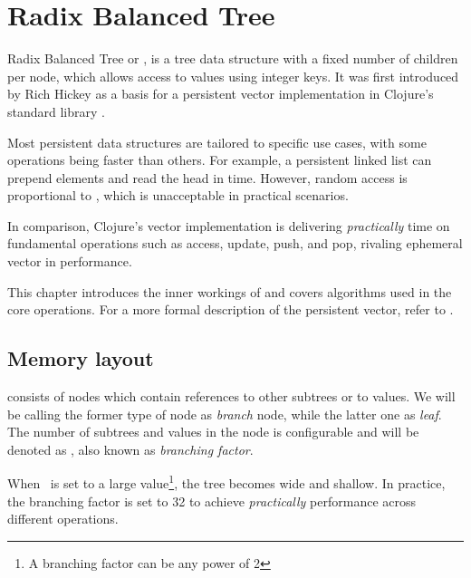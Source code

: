 

\chapter{Radix Balanced Tree}

Radix Balanced Tree or \rbtree, is a tree data structure with a fixed number of children per node, which allows access to values using integer keys. It was first introduced by Rich Hickey as a basis for a persistent vector implementation in Clojure's standard library \cite{the-clojure-programming-language}.

Most persistent data structures are tailored to specific use cases, with some operations being faster than others. For example, a persistent linked list can prepend elements and read the head in  time. However, random access is proportional to , which is unacceptable in practical scenarios.

In comparison, Clojure's vector implementation is delivering \emph{practically}  time on fundamental operations such as access, update, push, and pop, rivaling ephemeral vector in performance.

This chapter introduces the inner workings of \rbtree{} and covers algorithms used in the core operations. For a more formal description of the persistent vector, refer to \cite{improving-performance-through-transience}.

\section{Memory layout}
\label{sec:rb-tree-memory-layout}

\rbtree{} consists of nodes which contain references to other subtrees or to values. We will be calling the former type of node as \emph{branch} node, while the latter one as \emph{leaf}. The number of subtrees and values in the node is configurable and will be denoted as \m, also known as \emph{branching factor}.

When \m\ is set to a large value\footnote{A branching factor can be any power of 2}, the tree becomes wide and shallow. In practice, the branching factor is set to 32 to achieve \emph{practically}  performance across different operations.

